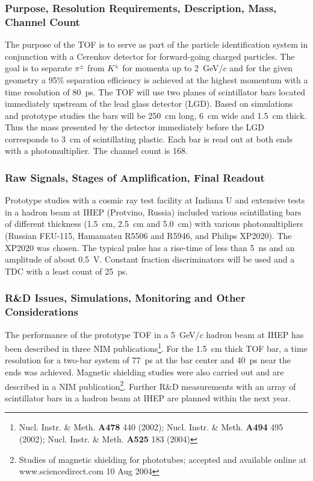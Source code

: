 \subsubsection*{Purpose, Resolution Requirements, Description, Mass, Channel Count}

The purpose of the TOF is to serve as part of the particle identification system
in conjunction with a Cerenkov detector for forward-going charged particles.  The
goal is to separate $\pi^{\pm}$ from $K^{\pm}$ for momenta up to 2~GeV/$c$ and 
for the given geometry a 95\% separation efficiency is achieved 
at the highest momentum with a time resolution of 80~ps.  The TOF will use
two planes of scintillator bars located immediately upstream of the lead glass
detector (LGD).  Based on simulations and prototype studies the bars will be
250~cm long, 6~cm wide and 1.5~cm thick.  Thus the mass presented by the 
detector immediately before the LGD corresponds to 3~cm of scintillating plastic.
Each bar is read out at both ends with a photomultiplier.  The channel count is 168.

\subsubsection*{Raw Signals, Stages of Amplification, Final Readout}

Prototype studies with a cosmic ray test facility at Indiana U and extensive tests
in a hadron beam at IHEP (Protvino, Russia) included various scintillating bars
of different thickness (1.5~cm, 2.5~cm and 5.0~cm) with various photomultipliers
(Russian FEU-115, Hamamatsu R5506 and R5946, and Philips XP2020).  The
XP2020 was chosen.   The typical pulse has a rise-time of less than 5~ns and
an amplitude of about 0.5~V.  Constant fraction discriminators will be used and 
a TDC with a least count of 25~ps.

\subsubsection*{R\&D Issues, Simulations, Monitoring and Other Considerations}

The performance of the prototype TOF in
a 5~GeV/$c$ hadron beam at IHEP has been described in three NIM 
publications\footnote{Nucl. Instr. \& Meth. \textbf{A478} 440 (2002); 
 Nucl. Instr. \& Meth. \textbf{A494} 495 (2002);
Nucl. Instr. \& Meth. \textbf{A525} 183 (2004) }.  For the 1.5~cm thick TOF bar,
a time resolution for a two-bar system of 77~ps at the bar center and 40~ps
near the ends was achieved.  Magnetic shielding studies were also carried out
and are described in a NIM publication\footnote{Studies of magnetic shielding
for phototubes; accepted and
available online at www.sciencedirect.com 10 Aug 2004}.  Further R\&D measurements
with an array of scintillator bars in a hadron beam at IHEP are planned within the
next year.


